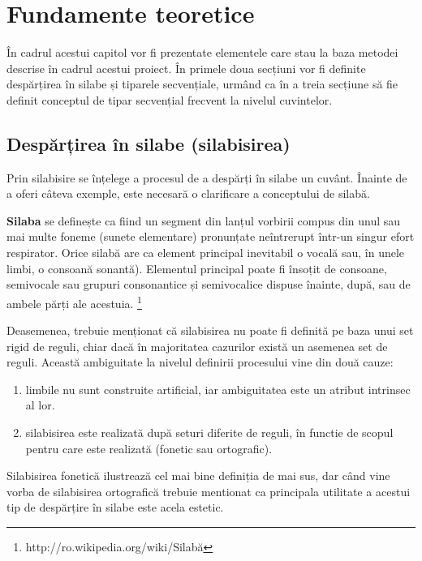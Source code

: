 \chapter{Fundamente teoretice}
\label{cap:fund-teoretice}

În cadrul acestui capitol vor fi prezentate elementele care stau la baza metodei descrise în cadrul acestui proiect. În primele doua secțiuni vor fi definite despărțirea în silabe și tiparele secvențiale, urmând ca în a treia secțiune să fie definit conceptul de tipar secvențial frecvent la nivelul cuvintelor.

\section{Despărțirea în silabe (silabisirea)}

Prin silabisire se înțelege a procesul de a despărți în silabe un cuvânt. Înainte de a oferi câteva exemple, este necesară o clarificare a conceptului de silabă. 

\begin{defi}
\textbf{Silaba} se definește ca fiind un segment din lanțul vorbirii compus din unul sau mai multe foneme (sunete elementare) pronunțate neîntrerupt într-un singur efort respirator. Orice silabă are ca element principal inevitabil o vocală sau, în unele limbi, o consoană sonantă). Elementul principal poate fi însoțit de consoane, semivocale sau grupuri consonantice și semivocalice dispuse înainte, după, sau de ambele părți ale acestuia. \footnote{http://ro.wikipedia.org/wiki/Silabă}
\end{defi} 

Deasemenea, trebuie menționat că silabisirea nu poate fi definită pe baza unui set rigid de reguli, chiar dacă în majoritatea cazurilor există un asemenea set de reguli. Această ambiguitate la nivelul definirii procesului vine din două cauze: 
\begin{enumerate}
\item limbile nu sunt construite artificial, iar ambiguitatea este un atribut intrinsec al lor. 
\item silabisirea este realizată după seturi diferite de reguli, în functie de scopul pentru care este realizată (fonetic sau ortografic).  
\end{enumerate}

Silabisirea fonetică ilustrează cel mai bine definiția de mai sus, dar când vine vorba de silabisirea ortografică trebuie mentionat ca principala utilitate a acestui tip de despărțire în silabe este acela estetic.

